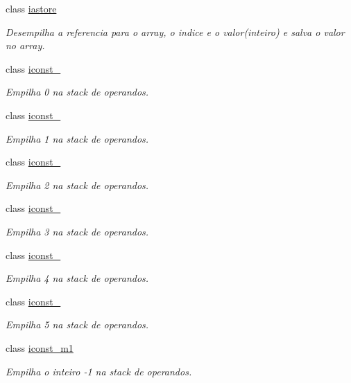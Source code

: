 \begin{DoxyCompactItemize}
class \hyperlink{class_instruction_impl_1_1iastore}{iastore}
\begin{DoxyCompactList}\small\item\em Desempilha a referencia para o array, o indice e o valor(inteiro) e salva o valor no array. \end{DoxyCompactList}\item 
class \hyperlink{class_instruction_impl_1_1iconst__0}{iconst\+\_}
\begin{DoxyCompactList}\small\item\em Empilha 0 na stack de operandos. \end{DoxyCompactList}\item 
class \hyperlink{class_instruction_impl_1_1iconst__1}{iconst\+\_}
\begin{DoxyCompactList}\small\item\em Empilha 1 na stack de operandos. \end{DoxyCompactList}\item 
class \hyperlink{class_instruction_impl_1_1iconst__2}{iconst\+\_}
\begin{DoxyCompactList}\small\item\em Empilha 2 na stack de operandos. \end{DoxyCompactList}\item 
class \hyperlink{class_instruction_impl_1_1iconst__3}{iconst\+\_}
\begin{DoxyCompactList}\small\item\em Empilha 3 na stack de operandos. \end{DoxyCompactList}\item 
class \hyperlink{class_instruction_impl_1_1iconst__4}{iconst\+\_}
\begin{DoxyCompactList}\small\item\em Empilha 4 na stack de operandos. \end{DoxyCompactList}\item 
class \hyperlink{class_instruction_impl_1_1iconst__5}{iconst\+\_}
\begin{DoxyCompactList}\small\item\em Empilha 5 na stack de operandos. \end{DoxyCompactList}\item 
class \hyperlink{class_instruction_impl_1_1iconst__m1}{iconst\+\_\+m1}
\begin{DoxyCompactList}\small\item\em Empilha o inteiro -\/1 na stack de operandos. \end{DoxyCompactList}\item 

\end{DoxyCompactItemize}
